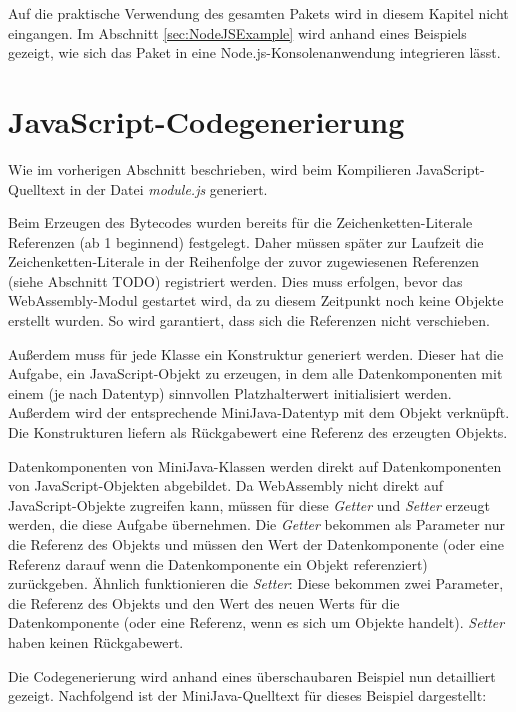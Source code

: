 Auf die praktische Verwendung des gesamten Pakets wird in diesem Kapitel nicht eingangen. Im Abschnitt \ref{sec:NodeJSExample} wird anhand eines Beispiels gezeigt, wie sich das Paket in eine Node.js-Konsolenanwendung integrieren lässt.

\section{JavaScript-Codegenerierung}

Wie im vorherigen Abschnitt beschrieben, wird beim Kompilieren Ja\-va\-Script-Quell\-text in der Datei \emph{module.js} generiert.

Beim Erzeugen des Bytecodes wurden bereits für die Zeichenketten-Literale Referenzen (ab 1 beginnend) festgelegt. Daher müssen später zur Laufzeit die Zeichenketten-Literale in der Reihenfolge der zuvor zugewiesenen Referenzen (siehe Abschnitt TODO) registriert werden. Dies muss erfolgen, bevor das WebAssembly-Modul gestartet wird, da zu diesem Zeitpunkt noch keine Objekte erstellt wurden. So wird garantiert, dass sich die Referenzen nicht verschieben.

Außerdem muss für jede Klasse ein Konstruktur generiert werden. Dieser hat die Aufgabe, ein JavaScript-Objekt zu erzeugen, in dem alle Datenkomponenten mit einem (je nach Datentyp) sinnvollen Platzhalterwert initialisiert werden. Außerdem wird der entsprechende MiniJava-Datentyp mit dem Objekt verknüpft. Die Konstrukturen liefern als Rückgabewert eine Referenz des erzeugten Objekts.

Datenkomponenten von MiniJava-Klassen werden direkt auf Datenkomponenten von Java\-Script-Objekten abgebildet. Da WebAssembly nicht direkt auf JavaScript-Objekte zugreifen kann, müssen für diese \emph{Getter} und \emph{Setter} erzeugt werden, die diese Aufgabe übernehmen. Die \emph{Getter} bekommen als Parameter nur die Referenz des Objekts und müssen den Wert der Datenkomponente (oder eine Referenz darauf wenn die Datenkomponente ein Objekt referenziert) zurückgeben. Ähnlich funktionieren die \emph{Setter}: Diese bekommen zwei Parameter, die Referenz des Objekts und den Wert des neuen Werts für die Datenkomponente (oder eine Referenz, wenn es sich um Objekte handelt). \emph{Setter} haben keinen Rückgabewert.

Die Codegenerierung wird anhand eines überschaubaren Beispiel nun detailliert gezeigt. Nachfolgend ist der MiniJava-Quelltext für dieses Beispiel dargestellt:



